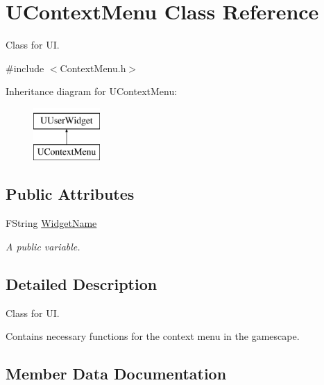 \hypertarget{class_u_context_menu}{}\section{U\+Context\+Menu Class Reference}
\label{class_u_context_menu}


Class for UI.  




{\ttfamily \#include $<$Context\+Menu.\+h$>$}

Inheritance diagram for U\+Context\+Menu\+:\begin{figure}[H]
\begin{center}
\leavevmode
\includegraphics[height=2.000000cm]{class_u_context_menu}
\end{center}
\end{figure}
\subsection*{Public Attributes}
\begin{DoxyCompactItemize}
\item 
F\+String \hyperlink{class_u_context_menu_abed1c996540fc75dc7e495a6e56d6bfb}{Widget\+Name}
\begin{DoxyCompactList}\small\item\em A public variable. \end{DoxyCompactList}\end{DoxyCompactItemize}


\subsection{Detailed Description}
Class for UI. 

Contains necessary functions for the context menu in the gamescape. 

\subsection{Member Data Documentation}
\hypertarget{class_u_context_menu_abed1c996540fc75dc7e495a6e56d6bfb}{}\label{class_u_context_menu_abed1c996540fc75dc7e495a6e56d6bfb} 
